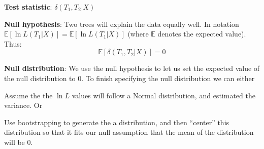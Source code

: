 \documentclass[11pt]{article}
\renewcommand{\subsubsection}[1]{%
\noindent\textbf{#1}:}
\newcommand{\lnL}{\ln L}
\newcommand{\expectation}{{\mathbb{E}}}
\newcommand{\expect}[1]{\expectation\left[#1\right]}
\begin{document}
\subsubsection{Test statistic} $\delta(T_1,T_2|X)$

\subsubsection{Null hypothesis} Two trees will explain the data equally well. 
In notation $\expect{\lnL(T_1|X)} = \expect{\lnL(T_1|X)}$ (where $\expectation$ denotes the expected value).  Thus:
$$\expect{\delta(T_1,T_2|X)} = 0$$

\subsubsection{Null distribution} We use the null hypothesis to let us set the expected value of the null distribution to 0.
To finish specifying the null distribution we can either
\begin{compactenum}
	\item Assume the the $\lnL$ values will follow a Normal distribution, and estimated the variance. Or
	\item Use bootstrapping to generate the a distribution, and then ``center'' this distribution so that it fits our null assumption that the mean of the distribution will be 0.
\end{compactenum}
\end{document}

